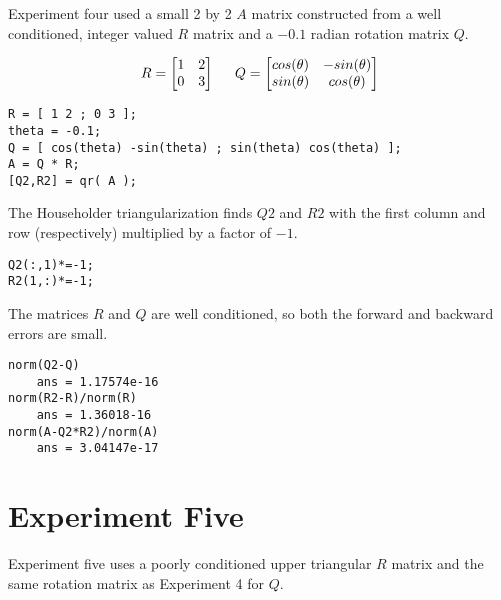 \documentclass{article}
\begin{document}
Experiment four used a small 2 by 2 \(A\) matrix constructed from a well conditioned, integer valued \(R\) matrix and a \(-0.1\) radian rotation matrix \(Q\).

\begin{equation}
R =
  \begin{bmatrix}
    1 & 2 \\
    0 & 3 \\
  \end{bmatrix}
\hspace{.2in}
Q = 
  \begin{bmatrix}
    cos(\theta) & -sin(\theta) \\
    sin(\theta) & cos(\theta) \\
  \end{bmatrix}
\label{eq1}
\end{equation}

\begin{framed}
\begin{verbatim}
R = [ 1 2 ; 0 3 ];
theta = -0.1;
Q = [ cos(theta) -sin(theta) ; sin(theta) cos(theta) ];
A = Q * R;
[Q2,R2] = qr( A );
\end{verbatim}
\end{framed}

The Householder triangularization finds \(Q2\) and \(R2\) with the first column and row (respectively) multiplied by a factor of \(-1\). 

\begin{framed}
\begin{verbatim}
Q2(:,1)*=-1;
R2(1,:)*=-1;
\end{verbatim}
\end{framed}

The matrices \(R\) and \(Q\) are well conditioned, so both the forward and backward errors are small.

\begin{framed}
\begin{verbatim}
norm(Q2-Q)
    ans = 1.17574e-16
norm(R2-R)/norm(R)
    ans = 1.36018-16
norm(A-Q2*R2)/norm(A)
    ans = 3.04147e-17
\end{verbatim}
\end{framed}

\section{Experiment Five}\label{m5}

Experiment five uses a poorly conditioned upper triangular \(R\) matrix and the same rotation matrix as Experiment 4 for \(Q\).
\end{document}

